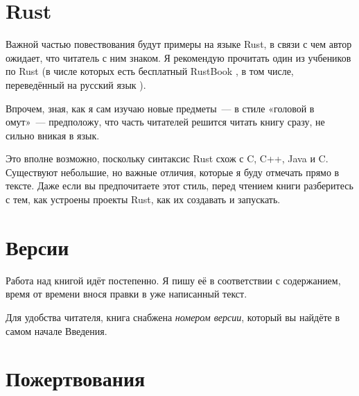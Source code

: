 \section{Rust}

Важной частью повествования будут примеры на языке Rust, в связи с чем автор ожидает, что читатель с ним знаком.
Я рекомендую прочитать один из учбеников по Rust (в числе которых есть бесплатный RustBook \cite{rustbook}, в том числе, переведённый на русский язык \cite{rustbook_ru}).

Впрочем, зная, как я сам изучаю новые предметы~--- в стиле «головой в омут»~--- предположу, что часть читателей решится читать книгу сразу, не сильно вникая в язык.

Это вполне возможно, поскольку синтаксис Rust схож с C, C++, Java и C\sharp.
Существуют небольшие, но важные отличия, которые я буду отмечать прямо в тексте.
Даже если вы предпочитаете этот стиль, перед чтением книги разберитесь с тем, как устроены проекты Rust, как их создавать и запускать.

\section{Версии}

Работа над книгой идёт постепенно. Я пишу её в соответствии с содержанием, время от времени внося правки в уже написанный текст.

Для удобства читателя, книга снабжена {\em номером версии}, который вы найдёте в самом начале Введения.

\section{Пожертвования}
